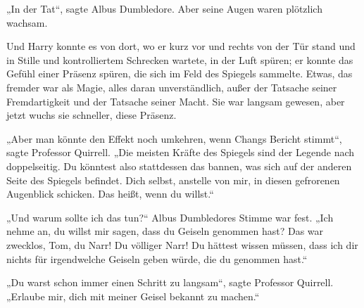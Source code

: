 „In der Tat“, sagte Albus Dumbledore.
Aber seine Augen waren plötzlich wachsam.

Und Harry konnte es von dort, wo er kurz vor und rechts von der Tür stand und in Stille und kontrolliertem Schrecken wartete, in der Luft spüren; er konnte das Gefühl einer Präsenz spüren, die sich im Feld des Spiegels sammelte. Etwas, das fremder war als Magie, alles daran unverständlich, außer der Tatsache seiner Fremdartigkeit und der Tatsache seiner Macht. Sie war langsam gewesen, aber jetzt wuchs sie schneller, diese Präsenz.

„Aber man könnte den Effekt noch umkehren, wenn Changs Bericht stimmt“, sagte Professor Quirrell. „Die meisten Kräfte des Spiegels sind der Legende nach doppelseitig. Du könntest also stattdessen das bannen, was sich auf der anderen Seite des Spiegels befindet. Dich selbst, anstelle von mir, in diesen gefrorenen Augenblick schicken. Das heißt, wenn du willst.“

„Und warum sollte ich das tun?“ Albus Dumbledores Stimme war fest.
„Ich nehme an, du willst mir sagen, dass du Geiseln genommen hast? Das war zwecklos, Tom, du Narr! Du völliger Narr! Du hättest wissen müssen, dass ich dir nichts für irgendwelche Geiseln geben würde, die du genommen hast.“

„Du warst schon immer einen Schritt zu langsam“, sagte Professor Quirrell.
„Erlaube mir, dich mit meiner Geisel bekannt zu machen.“

